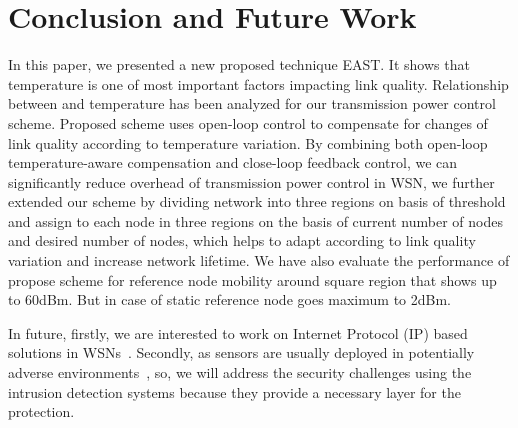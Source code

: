 \documentclass[12pt, conference, compsocconf, onecolumn, draftcls]{IEEEtran}
\begin{document}
\section{Conclusion and Future Work}

In this paper, we presented a new proposed technique  EAST. It shows that temperature is one of most important factors impacting link quality. Relationship between  and temperature has been analyzed for our transmission power control scheme. Proposed scheme uses open-loop control to compensate for changes of link quality according to temperature variation. By combining both open-loop temperature-aware compensation and close-loop feedback control, we can significantly reduce overhead of transmission power control in WSN, we  further extended our scheme by dividing network into three regions on basis of threshold  and assign  to each node in three regions on the basis of current number of nodes and desired number of nodes, which helps to adapt  according to link quality variation and increase network lifetime. We have also evaluate the performance of propose scheme for reference node mobility around square region that shows  up to 60dBm. But in case of static reference node  goes maximum to 2dBm.

In future, firstly, we are interested to work on Internet Protocol (IP) based solutions in WSNs~\cite{14}. Secondly, as sensors are usually deployed in potentially adverse environments~\cite{15}, so, we will address the security challenges using the intrusion detection systems because they provide a necessary layer for the protection.
\end{document}
